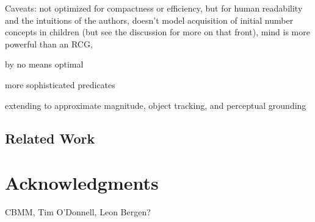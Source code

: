 \documentclass[10pt,letterpaper]{article}
\begin{document}
Caveats: not optimized for compactness or efficiency, but for human
readability and the intuitions of the authors, doesn't model
acquisition of initial number concepts in children (but see the
discussion for more on that front), mind is more powerful than an RCG,

by no means optimal

more sophisticated predicates

extending to approximate magnitude, object tracking, and perceptual grounding

\subsection{Related Work}

\section{Acknowledgments}

CBMM, Tim O'Donnell, Leon Bergen?



\setlength{\bibleftmargin}{.125in}
\setlength{\bibindent}{-\bibleftmargin}

\end{document}
